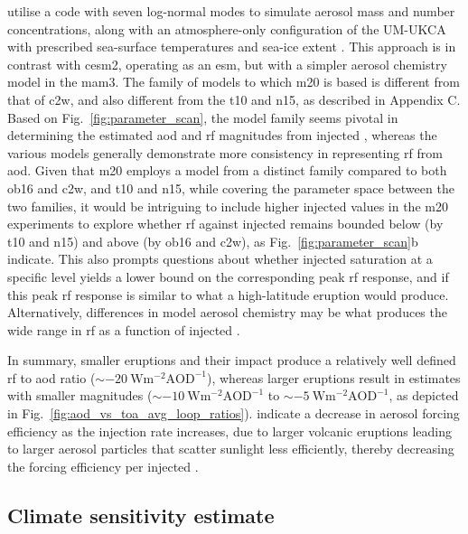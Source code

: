 \documentclass{ametsocV6.1}
\newcommand{\iso}[1][i]{{#1}njected \ce{SO2}}
\begin{document}
\citet{marshall2019, marshall2020, marshall2021} utilise a code with seven log-normal
modes to simulate aerosol mass and number concentrations, along with an atmosphere-only
configuration of the UM-UKCA with prescribed sea-surface temperatures and sea-ice extent
\citep{marshall2019}. This approach is in contrast with \gls{cesm2}, operating as an
\gls{esm}, but with a simpler aerosol chemistry model in the \gls{mam3}. The family of
models to which \gls{m20} is based is different from that of \gls{c2w}, and also
different from the \gls{t10} and \gls{n15}, as described in Appendix C. Based on
Fig.~\ref{fig:parameter_scan}, the model family seems pivotal in determining the
estimated \gls{aod} and \gls{rf} magnitudes from \iso{}, whereas the various models
generally demonstrate more consistency in representing \gls{rf} from \gls{aod}. Given
that \gls{m20} employs a model from a distinct family compared to both \gls{ob16} and
\gls{c2w}, and \gls{t10} and \gls{n15}, while covering the parameter space between the
two families, it would be intriguing to include higher \iso{} values in the \gls{m20}
experiments to explore whether \gls{rf} against \iso{} remains bounded below (by
\gls{t10} and \gls{n15}) and above (by \gls{ob16} and \gls{c2w}), as
Fig.~\ref{fig:parameter_scan}b indicate. This also prompts questions about whether
\iso{} saturation at a specific level yields a lower bound on the corresponding peak
\gls{rf} response, and if this peak \gls{rf} response is similar to what a high-latitude
eruption would produce. Alternatively, differences in model aerosol chemistry may be
what produces the wide range in \gls{rf} as a function of \iso{}.

In summary, smaller eruptions and their impact produce a relatively well defined
\gls{rf} to \gls{aod} ratio (\(\sim \SI{-20}{\watt\metre^{-2}\mathrm{AOD}^{-1}}\)),
whereas larger eruptions result in estimates with smaller magnitudes (\(\sim
\SI{-10}{\watt\metre^{-2}\mathrm{AOD}^{-1}}\) to \(\sim
\SI{-5}{\watt\metre^{-2}\mathrm{AOD}^{-1}}\), as depicted in
Fig.~\ref{fig:aod_vs_toa_avg_loop_ratios}). \citet{niemeier2017} indicate a decrease in
aerosol forcing efficiency as the injection rate increases, due to larger volcanic
eruptions leading to larger aerosol particles that scatter sunlight less efficiently,
thereby decreasing the forcing efficiency per \iso{} \citep{english2013, timmreck2018}.

\subsection{Climate sensitivity estimate}
\end{document}
